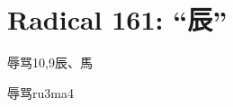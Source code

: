 
\section*{Radical 161: ``⾠''}

\begin{entry}{辱骂}{10,9}{⾠、⾺}
  \begin{phonetics}{辱骂}{ru3ma4}
  \end{phonetics}
\end{entry}


